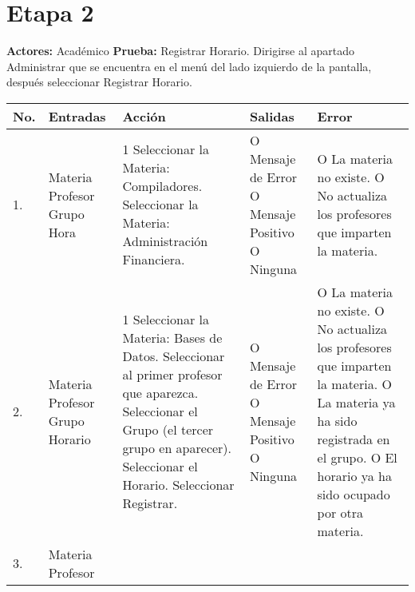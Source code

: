 \section*{Etapa 2}
\textbf{Actores:} Académico\newline
\textbf{Prueba:} Registrar Horario.\newline
Dirigirse al apartado Administrar que se encuentra en el menú del lado izquierdo de la pantalla, después seleccionar Registrar Horario.
\begin{longtable}{|p{0.7cm}|p{3cm}|p{6cm}|p{2.3cm}|p{3cm}|}
    \hline	
	\textbf{No.}
	&
	\textbf{Entradas}	
	&
	\textbf{Acción}
	&
	\textbf{Salidas}
	&
	\textbf{Error}
	\\
	\hline
	1.
	&
	Materia\newline
	Profesor\newline
	Grupo\newline
	Hora	
	&
	1 Seleccionar la Materia: Compiladores.\newline
	2 Seleccionar la Materia: Administración Financiera.
	&
	O Mensaje de Error\newline
 	O Mensaje Positivo\newline
 	O Ninguna	 	
 	&
 	O La materia no existe.\newline
 	O No actualiza los profesores que imparten la materia.\\
 	\hline
 	2.
	&
	Materia\newline
	Profesor\newline
	Grupo\newline
	Horario	
	&
	1 Seleccionar la Materia: Bases de Datos.\newline
	2 Seleccionar al primer profesor que aparezca.\newline
	3 Seleccionar el Grupo (el tercer grupo en aparecer).\newline
	4 Seleccionar el Horario.\newline
	5 Seleccionar Registrar.
	&
	O Mensaje de Error\newline
 	O Mensaje Positivo\newline
 	O Ninguna	 	
 	&
 	O La materia no existe.\newline
 	O No actualiza los profesores que imparten la materia.\newline
 	O La materia ya ha sido registrada en el grupo.\newline
 	O El horario ya ha sido ocupado por otra materia.\\
 	\hline
 	3.
	&
	Materia\newline
	Profesor\newline

\end{longtable}
